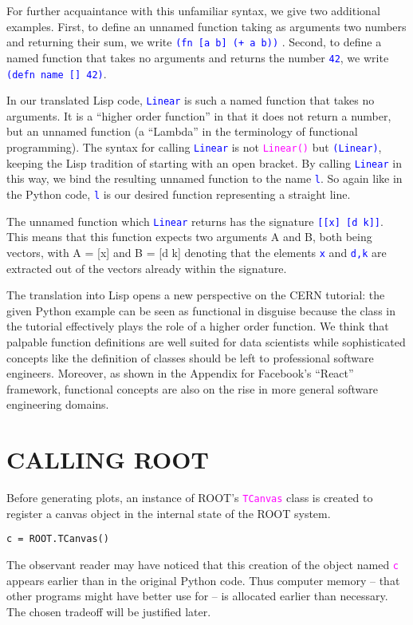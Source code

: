 \documentclass{IEEEcsmag}
\begin{document}
For further acquaintance with this unfamiliar syntax, we give two additional examples. First, to define an unnamed function taking as arguments two numbers and returning their sum, we write \texttt{\textcolor{blue}{(fn [a b] (+ a b))}} . Second, to define a named function that takes no arguments and returns the number \texttt{\textcolor{blue}{42}}, we write \texttt{\textcolor{blue}{(defn name [] 42)}}.

In our translated Lisp code, \texttt{\textcolor{blue}{Linear}} is such a named function that takes no arguments. It is a “higher order function” in that it does not return a number, but an unnamed function (a “Lambda” in the terminology of functional programming). The syntax for calling \texttt{\textcolor{blue}{Linear}} is not \texttt{\textcolor{magenta}{Linear()}} but \texttt{\textcolor{blue}{(Linear)}}, keeping the Lisp tradition of starting with an open bracket. By calling \texttt{\textcolor{blue}{Linear}} in this way, we bind the resulting unnamed function to the name \texttt{\textcolor{blue}{l}}. So again like in the Python code, \texttt{\textcolor{blue}{l}} is our desired function representing a straight line. 

The unnamed function which \texttt{\textcolor{blue}{Linear}} returns has the signature \texttt{\textcolor{blue}{[[x] [d k]]}}. This means that this function expects two arguments A and B, both being vectors, with A = [x] and B = [d k] denoting that the elements \texttt{\textcolor{blue}{x}} and \texttt{\textcolor{blue}{d,k}} are extracted out of the vectors already within the signature.

The translation into Lisp opens a new perspective on the CERN tutorial: the given Python example can be seen as functional in disguise because the class in the tutorial effectively plays the role of a higher order function. We think that palpable function definitions are well suited for data scientists while sophisticated concepts like the definition of classes should be left to professional software engineers. Moreover, as shown in the Appendix for Facebook’s “React” framework, functional concepts are also on the rise in more general software engineering domains.\vspace*{-5pt}

\section{CALLING ROOT}
Before generating plots, an instance of ROOT’s \texttt{\textcolor{magenta}{TCanvas}}  class is created to register a canvas object in the internal state of the ROOT system.
{\color{magenta}\begin{verbatim}
c = ROOT.TCanvas()
\end{verbatim}}
The observant reader may have noticed that this creation of the object named \texttt{\textcolor{magenta}{c}} appears earlier than in the original Python code. Thus computer memory – that other programs might have better use for – is allocated earlier than necessary. The chosen tradeoff will be justified later.\vspace*{-5pt}
\end{document}
